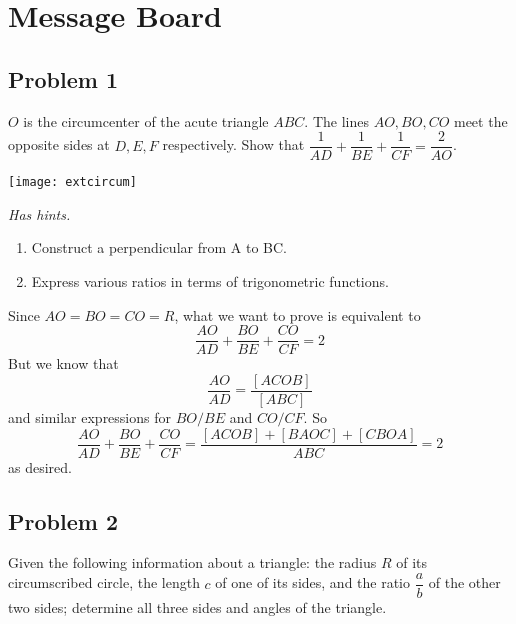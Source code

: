 \section{Message Board}


\subsection{Problem 1}
$O$ is the circumcenter of the acute triangle $ABC$. The lines $AO, BO, CO$ meet the opposite sides at $D, E, F$ respectively. Show that $\dfrac 1{AD} + \dfrac 1{BE} + \dfrac 1{CF} = \dfrac 2{AO}$.

\begin{center}
    \texttt{[image: extcircum]}
\end{center}

\textit{Has hints.}
\begin{sketch}
    \begin{enumerate}
        \item Construct a perpendicular from A to BC.
        \item Express various ratios in terms of trigonometric functions.
    \end{enumerate}
\end{sketch}

\begin{mdsoln}
    Since $AO=BO=CO=R$, what we want to prove is equivalent to$$\frac{AO}{AD}+\frac{BO}{BE}+\frac{CO}{CF}=2$$But we know that$$\frac{AO}{AD}=\frac{[ACOB]}{[ABC]}$$and similar expressions for $BO/BE$ and $CO/CF$. So$$\frac{AO}{AD}+\frac{BO}{BE}+\frac{CO}{CF}=\frac{[ACOB]+[BAOC]+[CBOA]}{ABC}=2$$as desired.
\end{mdsoln}


\subsection{Problem 2}
Given the following information about a triangle: the radius $R$ of its circumscribed circle, the length $c$ of one of its sides, and the ratio $\dfrac ab$ of the other two sides; determine all three sides and angles of the triangle.

